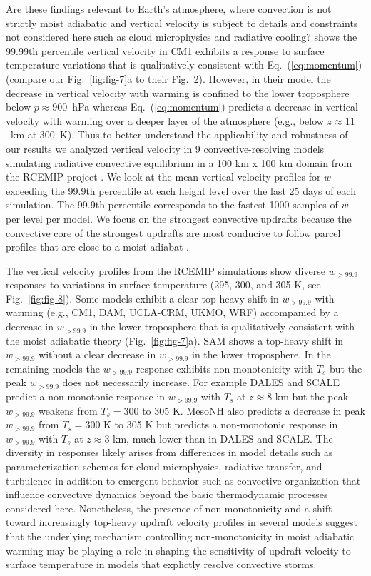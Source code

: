 \documentclass[draft]{ametsocV6.1}
\begin{document}
Are these findings relevant to Earth's atmosphere, where convection is not strictly moist adiabatic and vertical velocity is subject to details and constraints not considered here such as cloud microphysics and radiative cooling? \cite{singh2015} shows the 99.99th percentile vertical velocity in CM1 exhibits a response to surface temperature variations that is qualitatively consistent with Eq.~(\ref{eq:momentum}) (compare our Fig.~\ref{fig:fig-7}a to their Fig.~2). However, in their model the decrease in vertical velocity with warming is confined to the lower troposphere below $p\approx900$~hPa whereas Eq.~(\ref{eq:momentum}) predicts a decrease in vertical velocity with warming over a deeper layer of the atmosphere (e.g., below $z\approx11$~km at 300~K). Thus to better understand the applicability and robustness of our results we analyzed vertical velocity in 9 convective-resolving models simulating radiative convective equilibrium in a 100 km x 100 km domain from the RCEMIP project \citep{wing2018}. We look at the mean vertical velocity profiles for $w$ exceeding the 99.9th percentile at each height level over the last 25 days of each simulation. The 99.9th percentile corresponds to the fastest 1000 samples of $w$ per level per model. We focus on the strongest convective updrafts because the convective core of the strongest updrafts are most conducive to follow parcel profiles that are close to a moist adiabat \citep{riehl1958}.

The vertical velocity profiles from the RCEMIP simulations show diverse $w_{>99.9}$ responses to variations in surface temperature (295, 300, and 305 K, see Fig.~\ref{fig:fig-8}). Some models exhibit a clear top-heavy shift in $w_{>99.9}$ with warming (e.g., CM1, DAM, UCLA-CRM, UKMO, WRF) accompanied by a decrease in $w_{>99.9}$ in the lower troposphere that is qualitatively consistent with the moist adiabatic theory (Fig.~\ref{fig:fig-7}a). SAM shows a top-heavy shift in $w_{>99.9}$ without a clear decrease in $w_{>99.9}$ in the lower troposphere. In the remaining models the $w_{>99.9}$ response exhibits non-monotonicity with $T_s$ but the peak $w_{>99.9}$ does not necessarily increase. For example DALES and SCALE predict a non-monotonic response in $w_{>99.9}$ with $T_s$ at $z\approx8$ km but the peak $w_{>99.9}$ weakens from $T_s=300$ to 305 K. MesoNH also predicts a decrease in peak $w_{>99.9}$ from $T_s=300$ K to 305 K but predicts a non-monotonic response in $w_{>99.9}$ with $T_s$ at $z\approx3$ km, much lower than in DALES and SCALE. The diversity in responses likely arises from differences in model details such as parameterization schemes for cloud microphysics, radiative transfer, and turbulence in addition to emergent behavior such as convective organization that influence convective dynamics beyond the basic thermodynamic processes considered here. Nonetheless, the presence of non-monotonicity and a shift toward increasingly top-heavy updraft velocity profiles in several models suggest that the underlying mechanism controlling non-monotonicity in moist adiabatic warming may be playing a role in shaping the sensitivity of updraft velocity to surface temperature in models that explictly resolve convective storms.
\end{document}
